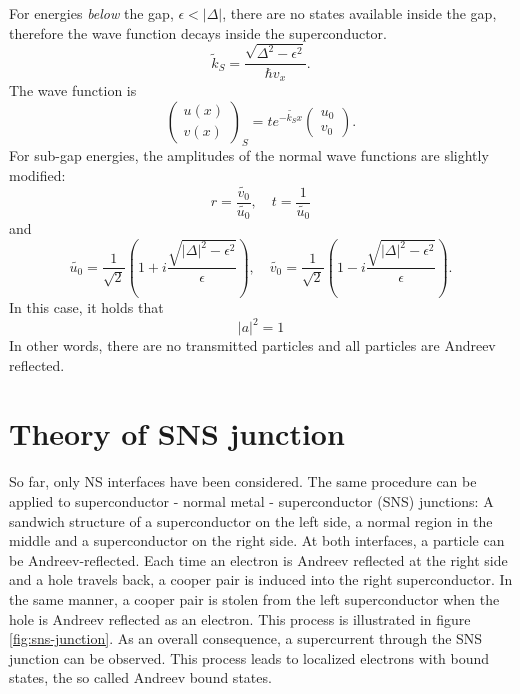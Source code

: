 \newline
\newline
For energies \emph{below} the gap, $\epsilon < |\Delta |$, there are no states available inside the gap, therefore the wave function decays inside the superconductor. 
\begin{equation}
\tilde{k}_S= \frac{\sqrt{\Delta^2 - \epsilon^2 }}{\hbar v_x}.
\end{equation}
The wave function is
\begin{equation}
\begin{pmatrix} u\left(x\right) \\ v\left(x\right) \end{pmatrix}_S = t e^{- \tilde{k_S} x } \begin{pmatrix} u_0 \\ v_0 \end{pmatrix}.
\end{equation}
For sub-gap energies, the amplitudes of the normal wave functions are slightly modified:
\begin{equation}
r = \frac{\tilde{v_0}}{\tilde{u_0}}, \quad t = \frac{1}{\tilde{u_0}}
\end{equation}
and 
\begin{equation}
\tilde{u_0} = \frac{1}{\sqrt{2}} \left( 1 + i \frac{\sqrt{|\Delta|^2 - \epsilon^2}}{\epsilon} \right), \quad \tilde{v_0} = \frac{1}{\sqrt{2}} \left( 1 - i \frac{\sqrt{|\Delta|^2 - \epsilon^2}}{\epsilon} \right).
\end{equation}
In this case, it holds that
\begin{equation}
|a|^2 = 1
\end{equation}
In other words, there are no transmitted particles and all particles are Andreev reflected.

\section{Theory of SNS junction}\label{sec:theory-sns}
So far, only NS interfaces have been considered. The same procedure can be applied to superconductor - normal metal - superconductor (SNS) junctions: A sandwich structure of a superconductor on the left side, a normal region in the middle and a superconductor on the right side. At both interfaces, a particle can be Andreev-reflected.
Each time an electron is Andreev reflected at the right side and a hole travels back, a cooper pair is induced into the right superconductor. In the same manner, a cooper pair is stolen from the left superconductor when the hole is Andreev reflected as an electron. This process is illustrated in figure \ref{fig:sns-junction}. As an overall consequence, a supercurrent through the SNS junction can be observed. This process leads to localized electrons with bound states, the so called Andreev bound states. \\

